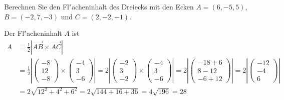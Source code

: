 Berechnen Sie den Fl"acheninhalt des Dreiecks mit den Ecken $A=(6,-5,5)$,
$B=(-2,7,-3)$ und $C=(2,-2,-1)$.

\begin{loesung}
Der Fl"acheninhalt $A$ ist
\begin{align*}
A&=\frac12|\overrightarrow{AB}\times\overrightarrow{AC}|\\
&=
\frac12\left|
\begin{pmatrix}-8\\12\\-8\end{pmatrix}
\times
\begin{pmatrix}-4\\3\\-6\end{pmatrix}
\right|
=
2\left|
\begin{pmatrix}-2\\3\\-2\end{pmatrix}
\times
\begin{pmatrix}-4\\3\\-6\end{pmatrix}
\right|
=
2\left|
\begin{pmatrix}
-18+6\\8-12\\-6+12
\end{pmatrix}
\right|
=
2\left|
\begin{pmatrix}
-12\\-4\\6
\end{pmatrix}
\right|
\\
&=
2\sqrt{12^2+4^2+6^2}
=
2\sqrt{144+16+36}=4\sqrt{196}=28
\end{align*}

\end{loesung}

